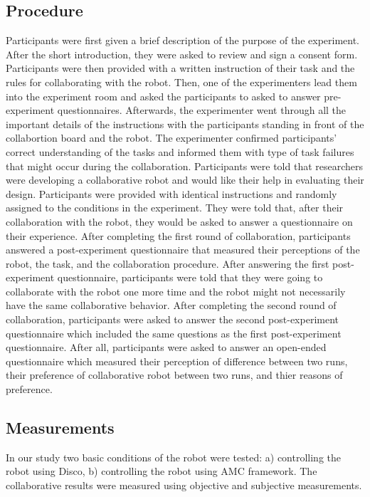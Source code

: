 \documentclass{sig-alternate-05-2015}
\begin{document}
\subsection{Procedure}
\label{sec:procedure}
Participants were first given a brief description of the purpose of the
experiment. After the short introduction, they were asked to review and sign a
consent form. Participants were then provided with a written instruction of
their task and the rules for collaborating with the robot. Then, one of the
experimenters lead them into the experiment room and asked the participants
to asked to answer pre-experiment questionnaires. Afterwards, the experimenter
went through all the important details of the instructions with the participants
standing in front of the collabortion board and the robot. The experimenter
confirmed participants' correct understanding of the tasks and informed them
with type of task failures that might occur during the collaboration.
Participants were told that researchers were developing a collaborative robot
and would like their help in evaluating their design. Participants were provided
with identical instructions and randomly assigned to the conditions in the
experiment. They were told that, after their collaboration with the robot, they
would be asked to answer a questionnaire on their experience. After completing
the first round of collaboration, participants answered a post-experiment
questionnaire that measured their perceptions of the robot, the task, and
the collaboration procedure. After answering the first post-experiment
questionnaire, participants were told that they were going to collaborate with
the robot one more time and the robot might not necessarily have the same
collaborative behavior. After completing the second round of collaboration,
participants were asked to answer the second post-experiment questionnaire which
included the same questions as the first post-experiment questionnaire. After
all, participants were asked to answer an open-ended questionnaire which
measured their perception of difference between two runs, their preference of
collaborative robot between two runs, and thier reasons of preference.

\subsection{Measurements}

In our study two basic conditions of the robot were tested: a) controlling the
robot using Disco, b) controlling the robot using AMC framework. The
collaborative results were measured using objective and subjective measurements.
\end{document}
